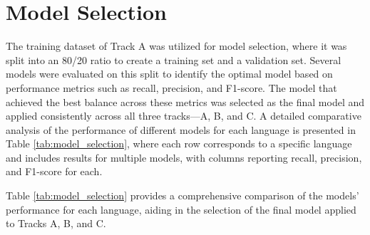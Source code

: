 \section{Model Selection}
\label{sec:appendix_model_selection}
The training dataset of Track A was utilized for model selection, where it was split into an 80/20 ratio to create a training set and a validation set. Several models were evaluated on this split to identify the optimal model based on performance metrics such as recall, precision, and F1-score. The model that achieved the best balance across these metrics was selected as the final model and applied consistently across all three tracks—A, B, and C. A detailed comparative analysis of the performance of different models for each language is presented in Table \ref{tab:model_selection}, where each row corresponds to a specific language and includes results for multiple models, with columns reporting recall, precision, and F1-score for each.



Table \ref{tab:model_selection} provides a comprehensive comparison of the models' performance for each language, aiding in the selection of the final model applied to Tracks A, B, and C.

